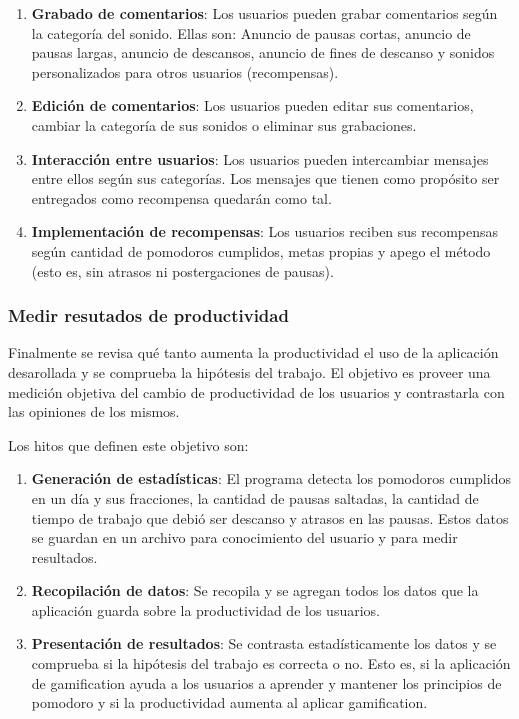\documentclass[12pt,letterpaper]{report}
\providecommand{\tightlist}{%
  \setlength{\itemsep}{0pt}\setlength{\parskip}{0pt}}
\begin{document}
\begin{enumerate}\tightlist{}
  \item \textbf{Grabado de comentarios}: Los usuarios pueden grabar comentarios según la categoría del sonido. Ellas
    son: Anuncio de pausas cortas, anuncio de pausas largas, anuncio de descansos, anuncio de fines de descanso y sonidos
    personalizados para otros usuarios (recompensas).
  \item \textbf{Edición de comentarios}: Los usuarios pueden editar sus comentarios, cambiar la categoría de sus sonidos
    o eliminar sus grabaciones.
  \item \textbf{Interacción entre usuarios}: Los usuarios pueden intercambiar mensajes entre ellos según sus categorías.
    Los mensajes que tienen como propósito ser entregados como recompensa quedarán como tal.
  \item \textbf{Implementación de recompensas}: Los usuarios reciben sus recompensas según cantidad de pomodoros cumplidos,
    metas propias y apego el método (esto es, sin atrasos ni postergaciones de pausas).
\end{enumerate}

\subsubsection{Medir resutados de productividad}\label{medir-resultados-de-productividad}

Finalmente se revisa qué tanto aumenta la productividad el uso de la aplicación desarollada y se comprueba la hipótesis
del trabajo. El objetivo es proveer una medición objetiva del cambio de productividad de los usuarios y contrastarla con
las opiniones de los mismos.

Los hitos que definen este objetivo son:

\begin{enumerate}\tightlist{}
  \item \textbf{Generación de estadísticas}: El programa detecta los pomodoros cumplidos en un día y sus fracciones, la cantidad
    de pausas saltadas, la cantidad de tiempo de trabajo que debió ser descanso y atrasos en las pausas. Estos datos se
    guardan en un archivo para conocimiento del usuario y para medir resultados.
  \item \textbf{Recopilación de datos}: Se recopila y se agregan todos los datos que la aplicación guarda sobre la productividad
    de los usuarios.
  \item \textbf{Presentación de resultados}: Se contrasta estadísticamente los datos y se comprueba si la hipótesis del trabajo
    es correcta o no. Esto es, si la aplicación de gamification ayuda a los usuarios a aprender y mantener los
    principios de pomodoro y si la productividad aumenta al aplicar gamification.
\end{enumerate}
\end{document}
